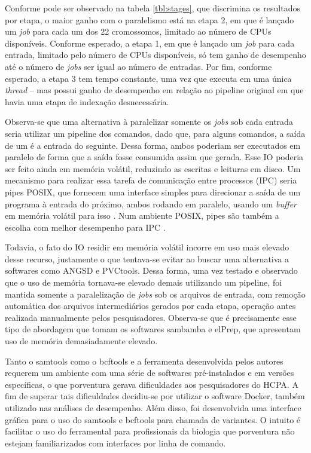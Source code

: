 \documentclass[cic,tc]{iiufrgs}
\begin{document}
{Conforme pode ser observado na tabela \ref{tbl:stages}, que discrimina os
resultados por etapa, o maior ganho com o paralelismo está na etapa 2, em que é
lançado um \textit{job} para cada um dos 22 cromossomos, limitado ao número de
CPUs disponíveis. Conforme esperado, a etapa 1, em que é lançado um
\textit{job} para cada entrada, limitado pelo número de CPUs disponíveis, só
tem ganho de desempenho até o número de \textit{jobs} ser igual ao número de
entradas. Por fim, conforme esperado, a etapa 3 tem tempo constante, uma vez
que executa em uma única \textit{thread} -- mas possui ganho de desempenho em relação ao
pipeline original em que havia uma etapa de indexação desnecessária.

Observa-se que uma alternativa à paralelizar somente os \textit{jobs} sob cada
entrada seria utilizar um pipeline dos comandos, dado que, para alguns
comandos, a saída de um é a entrada do seguinte. Dessa forma, ambos poderiam
ser executados em paralelo de forma que a saída fosse consumida assim que
gerada. Esse IO poderia ser feito ainda em memória volátil, reduzindo as
escritas e leituras em disco. Um mecanismo para realizar essa tarefa de
comunicação entre processos (IPC) seria pipes POSIX, que fornecem uma interface
simples para direcionar a saída de um programa à entrada do próximo, ambos
rodando em paralelo, usando um \textit{buffer} em memória volátil para
isso \cite{immich2003performance}. Num ambiente POSIX, pipes são também a
escolha com melhor desempenho para IPC \cite{immich2003performance}.

Todavia, o fato do IO residir em memória volátil incorre em uso mais elevado
desse recurso, justamente o que tentava-se evitar ao buscar uma alternativa a
softwares como ANGSD e PVCtools. Dessa forma, uma vez testado e observado que o
uso de memória tornava-se elevado demais utilizando um pipeline, foi mantida
somente a paralelização de \textit{jobs} sob os arquivos de entrada, com
remoção automática dos arquivos intermediários gerados por cada etapa, operação
antes realizada manualmente pelos pesquisadores. Observa-se que é precisamente
esse tipo de abordagem que tomam os softwares sambamba e elPrep, que apresentam
uso de memória demasiadamente elevado.

Tanto o samtools como o bcftools e a ferramenta desenvolvida pelos autores
requerem um ambiente com uma série de softwares pré-instalados e em versões
específicas, o que porventura gerava dificuldades aos pesquisadores do HCPA. A
fim de superar tais dificuldades decidiu-se por utilizar o software Docker,
também utilizado nas análises de desempenho. Além disso, foi desenvolvida uma
interface gráfica para o uso do samtools e bcftools para chamada de variantes.
O intuito é facilitar o uso do ferramental para profissionais da biologia que
porventura não estejam familiarizados com interfaces por linha de comando.

}
\end{document}
